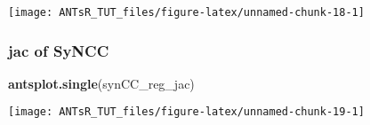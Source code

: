 \documentclass[]{tufte-handout}
\newenvironment{Shaded}{}{}
\newcommand{\KeywordTok}[1]{\textcolor[rgb]{0.00,0.44,0.13}{\textbf{#1}}}
\newcommand{\NormalTok}[1]{#1}
\begin{document}
\texttt{[image: ANTsR\_TUT\_files/figure-latex/unnamed-chunk-18-1]}

\hypertarget{jac-of-syncc}{%
\subsubsection{jac of SyNCC}\label{jac-of-syncc}}

\begin{Shaded}
\begin{Highlighting}[]
\KeywordTok{antsplot.single}\NormalTok{(synCC_reg_jac)}
\end{Highlighting}
\end{Shaded}

\texttt{[image: ANTsR\_TUT\_files/figure-latex/unnamed-chunk-19-1]}
\end{document}
